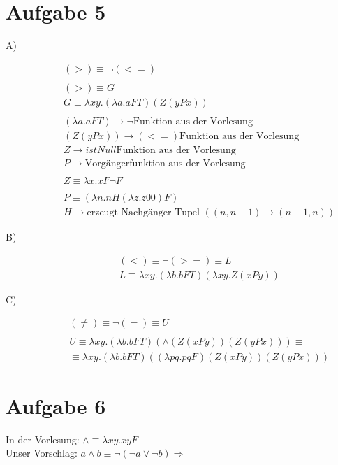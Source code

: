 \documentclass[11]{article}
\begin{document}
\section*{Aufgabe 5}
\begin{description}
\item[A)]
\begin{align*}
& (>) \equiv \neg (<=) \\ \\
& (>) \equiv G \\
& G \equiv \lambda xy.(\lambda a.aFT)(Z (yPx)) \\ \\
& (\lambda a.aFT) \rightarrow \neg \text{Funktion aus der Vorlesung} \\
& (Z (yPx)) \rightarrow (<=) \text{Funktion aus der Vorlesung} \\
& Z \rightarrow istNull \text{Funktion aus der Vorlesung} \\
& P \rightarrow \text{Vorgängerfunktion aus der Vorlesung} \\ \\
& Z \equiv \lambda x.xF\neg F \\ \\
& P \equiv (\lambda n.nH(\lambda z.z00)F) \\
& H \rightarrow \text{erzeugt Nachgänger Tupel }( (n, n-1) \rightarrow (n+1, n) )
\end{align*}
\item[B)]
\begin{align*}
& (<) \equiv \neg (>=) \equiv L \\
& L \equiv \lambda xy.(\lambda b.bFT)(\lambda xy.Z(xPy)) 
\end{align*}
\item[C)]
\begin{align*}
& (\not=) \equiv \neg (=) \equiv U \\ \\
& U \equiv \lambda xy.(\lambda b.bFT)(\land (Z(xPy)) (Z (yPx))) \equiv \\
& \equiv \lambda xy.(\lambda b.bFT)( (\lambda pq.pqF ) (Z(xPy)) (Z (yPx)))
\end{align*}
\end{description}
%
\section*{Aufgabe 6}
In der Vorlesung: $\land \equiv \lambda xy.xyF$ \\
Unser Vorschlag: $a \land b \equiv \neg (\neg a \lor \neg b) \Rightarrow$
\end{document}
